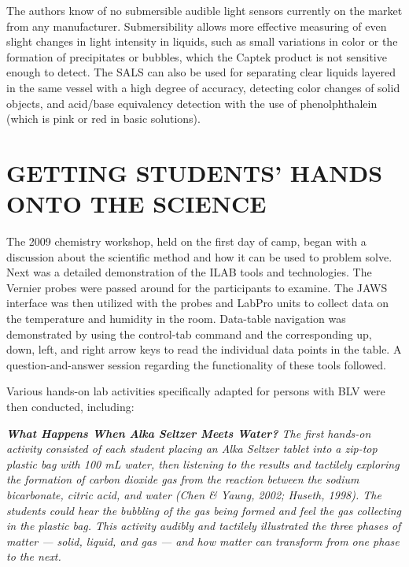 \documentclass[11.5pt]{sig-alternate} %
\begin{document}
\begin{large}
The authors know of no submersible audible light sensors currently on the market from any manufacturer. Submersibility allows more effective measuring of even slight changes in light intensity in liquids, such as small variations in color or the formation of precipitates or bubbles, which the Captek product is not sensitive enough to detect. The SALS can also be used for separating clear liquids layered in the same vessel with a high degree of accuracy, detecting color changes of solid objects, and acid/base equivalency detection with the use of phenolphthalein (which is pink or red in basic solutions).

\section*{GETTING STUDENTS’ HANDS ONTO THE SCIENCE}
The 2009 chemistry workshop, held on the first day of camp, began with a discussion about the scientific method and how it can be used to problem solve. Next was a detailed demonstration of the ILAB tools and technologies. The Vernier probes were passed around for the participants to examine. The JAWS interface was then utilized with the probes and LabPro units to collect data on the temperature and humidity in the room. Data-table navigation was demonstrated by using the control-tab command and the corresponding up, down, left, and right arrow keys to read the individual data points in the table. A question-and-answer session regarding the functionality of these tools followed.

Various hands-on lab activities specifically adapt\-ed for persons with BLV were then conducted, including:

\textit{\textbf{What Happens When Alka Seltzer Meets Water?} The first hands-on activity consisted of each student placing an Alka Seltzer tablet into a zip-top plastic bag with 100 mL water, then listening to the results and tactilely exploring the formation of carbon dioxide gas from the reaction between the sodium bicarbonate, citric acid, and water (Chen \& Yaung, 2002; Huseth, 1998). The students could hear the bubbling of the gas being formed and feel the gas collecting in the plastic bag. This activity audibly and tactilely illustrated the three phases of matter — solid, liquid, and gas — and how matter can transform from one phase to the next.}


\end{large}
\end{document}
